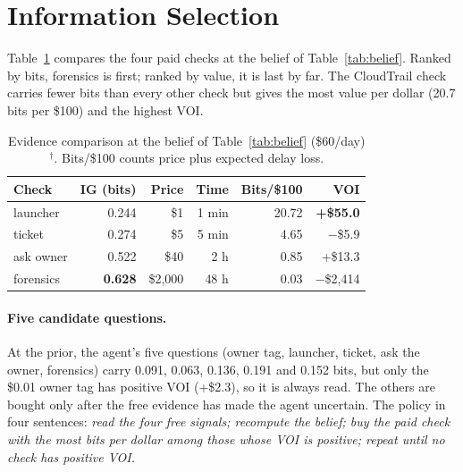 \documentclass{article}
\newcommand{\hyp}{$^{\dagger}$}
\begin{document}
\section{Information Selection}

Table~\ref{tab:evidence} compares the four paid checks at the belief of Table~\ref{tab:belief}. Ranked by bits, forensics is first; ranked by value, it is last by far. The CloudTrail check carries fewer bits than every other check but gives the most value per dollar (20.7 bits per \$100) and the highest VOI.

\begin{table}[t]\centering\small\setlength{\tabcolsep}{3pt}
\begin{tabular}{lrrrrr}\toprule
Check & IG (bits) & Price & Time & Bits/\$100 & VOI\\\midrule
launcher & 0.244 & \$1 & 1 min & 20.72 & \textbf{+\$55.0}\\
ticket & 0.274 & \$5 & 5 min & 4.65 & $-$\$5.9\\
ask owner & 0.522 & \$40 & 2 h & 0.85 & +\$13.3\\
forensics & \textbf{0.628} & \$2,000 & 48 h & 0.03 & $-$\$2,414\\\bottomrule
\end{tabular}
\caption{Evidence comparison at the belief of Table~\ref{tab:belief} (\$60/day)\hyp. Bits/\$100 counts price plus expected delay loss.}\label{tab:evidence}
\end{table}

\paragraph{Five candidate questions.} At the prior, the agent's five questions (owner tag, launcher, ticket, ask the owner, forensics) carry 0.091, 0.063, 0.136, 0.191 and 0.152 bits, but only the \$0.01 owner tag has positive VOI (+\$2.3), so it is always read. The others are bought only after the free evidence has made the agent uncertain. The policy in four sentences: \emph{read the four free signals; recompute the belief; buy the paid check with the most bits per dollar among those whose VOI is positive; repeat until no check has positive VOI.}
\end{document}
